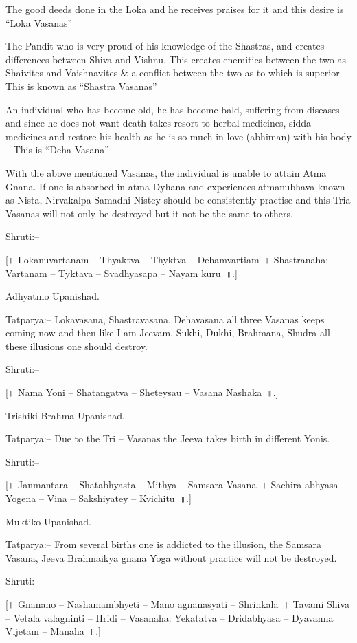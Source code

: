 \item The good deeds done in the Loka and he receives praises for it and this desire is “Loka Vasanas”

 \item The Pandit who is very proud of his knowledge of the Shastras, and creates differences between Shiva and Vishnu. This creates enemities between the two as Shaivites and Vaishnavites \& a conflict between the two as to which is superior. This is known as “Shastra Vasanas”

 \item An individual who has become old, he has become bald, suffering from diseases and since he does not want death takes resort to herbal medicines, sidda medicines and restore his health as he is so much in love (abhiman) with his body – This is “Deha Vasana”

With the above mentioned Vasanas, the individual is unable to attain Atma Gnana. If one is absorbed in atma Dyhana and experiences atmanubhava known as Nista, Nirvakalpa Samadhi Nistey should be consistently practise and this Tria Vasanas will not only be destroyed but it not be the same to others.

Shruti:–

[॥ Lokanuvartanam – Thyaktva – Thyktva – Dehamvartiam~। Shastranaha: Vartanam – Tyktava – Svadhyasapa – Nayam kuru~॥.]

Adhyatmo Upanishad.

Tatparya:– Lokavasana, Shastravasana, Dehavasana all three Vasanas keeps coming now and then like I am Jeevam. Sukhi, Dukhi, Brahmana, Shudra all these illusions one should destroy.

Shruti:–

[॥ Nama Yoni – Shatangatva – Sheteysau – Vasana Nashaka~॥.]

Trishiki Brahma Upanishad.

Tatparya:– Due to the Tri – Vasanas the Jeeva takes birth in different Yonis.

Shruti:–

[॥ Janmantara – Shatabhyasta – Mithya – Samsara Vasana~। Sachira abhyasa – Yogena – Vina – Sakshiyatey – Kvichitu~॥.]

Muktiko Upanishad.

Tatparya:– From several births one is addicted to the illusion, the Samsara Vasana, Jeeva Brahmaikya gnana Yoga without practice will not be destroyed.

Shruti:–

[॥ Gnanano – Nashamambhyeti – Mano agnanasyati – Shrinkala~। Tavami Shiva – Vetala valagninti – Hridi – Vasanaha: Yekatatva – Dridabhyasa – Dyavanna Vijetam – Manaha~॥.]

